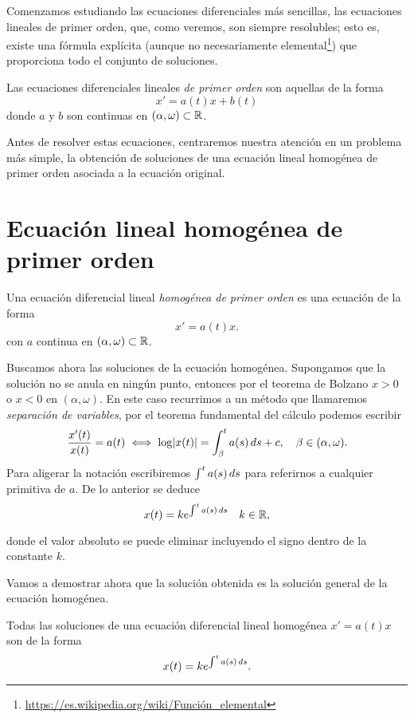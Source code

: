 \documentclass[../ecuaciones_diferenciales.tex]{subfiles}
\begin{document}
Comenzamos estudiando las ecuaciones diferenciales más sencillas, las ecuaciones
lineales de primer orden, que, como veremos, son siempre resolubles; esto es,
existe una fórmula explícita (aunque no necesariamente
elemental\footnote{\url{https://es.wikipedia.org/wiki/Función_elemental}}) que
proporciona todo el conjunto de soluciones.

\begin{definition}
    Las ecuaciones diferenciales lineales \emph{de primer orden} son aquellas de
    la forma
	\[x' = a(t)x + b(t)\]
	donde \(a\) y \(b\) son continuas en \((\alpha, \omega) \subset \mathbb{R}\).
\end{definition}

Antes de resolver estas ecuaciones, centraremos nuestra atención en un problema
más simple, la obtención de soluciones de una ecuación lineal homogénea de
primer orden asociada a la ecuación original.

\section{Ecuación lineal homogénea de primer orden} \label{sec:hom}

\begin{definition}
    Una ecuación diferencial lineal \emph{homogénea de primer orden} es una
    ecuación de la forma
	\[x' = a(t)x.\]
	con \(a\) continua en \((\alpha, \omega) \subset \mathbb{R}\).
\end{definition}

Buscamos ahora las soluciones de la ecuación homogénea. Supongamos que la
solución no se anula en ningún punto, entonces por el teorema de Bolzano
\(x > 0\) o \(x < 0\) en \((\alpha, \omega)\). En este caso recurrimos a un
método que llamaremos \emph{separación de variables}, por el teorema fundamental
del cálculo podemos escribir
\[\frac{x'(t)}{x(t)} = a(t) \iff \log\abs{x(t)}
	= \int_{\beta}^t a(s) \dif s + c,
	\quad \beta \in (\alpha, \omega).\]
Para aligerar la notación escribiremos \(\int^t a(s) \mathop{d\!} s\) para referirnos
a cualquier primitiva de \(a\). De lo anterior se deduce
\[x(t) = k e^{\int^t a(s) \mathop{d\!} s} \quad k \in \mathbb{R},\]

donde el valor absoluto se puede eliminar incluyendo el signo dentro de la
constante \(k\).

Vamos a demostrar ahora que la solución obtenida es la solución general de la
ecuación homogénea.

\begin{theorem} \label{thm:sol_gen}
	Todas las soluciones de una ecuación diferencial lineal homogénea
	\(x' = a(t)x\) son de la forma
	\[x(t) = k e^{\int^t a(s) \mathop{d\!} s}.\]
\end{theorem}
\end{document}
